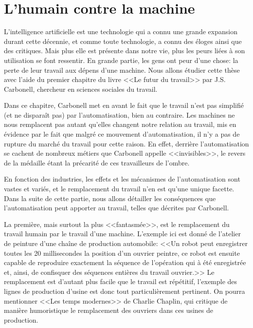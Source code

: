 \documentclass[openany, 11pt]{memoir}
\begin{document}

\chapter{L'humain contre la machine}


L'intelligence artificielle est une technologie qui a connu une grande expansion durant cette décennie, et comme toute technologie, a connu des éloges ainsi que des critiques. Mais plus elle est présente dans notre vie, plus les peurs liées à son utilisation se font ressentir. En grande partie, les gens ont peur d'une chose: la perte de leur travail aux dépens d'une machine. Nous allons étudier cette thèse avec l'aide du premier chapitre du livre <<Le futur du travail>> \cite{futurtravail} par J.S. Carbonell, chercheur en sciences sociales du travail.

Dans ce chapitre, Carbonell met en avant le fait que le travail n'est pas simplifié (et ne disparaît pas) par l'automatisation, bien au contraire. Les machines ne nous remplacent pas autant qu'elles changent notre relation au travail, mis en évidence par le fait que malgré ce mouvement d'automatisation, il n'y a pas de rupture du marché du travail pour cette raison. En effet, derrière l'automatisation se cachent de nombreux métiers que Carbonell appelle <<invisibles>>, le revers de la médaille étant la précarité de ces travailleurs de l'ombre.

En fonction des industries, les effets et les mécanismes de l'automatisation sont vastes et variés, et le remplacement du travail n'en est qu'une unique facette. Dans la suite de cette partie, nous allons détailler les conséquences que l'automatisation peut apporter au travail, telles que décrites par Carbonell.

\bigskip
La première, mais surtout la plus <<fantasmée>>, est le remplacement du travail humain par le travail d'une machine. L'exemple ici est donné de l'atelier de peinture d'une chaîne de production automobile: <<Un robot peut enregistrer toutes les 20 millisecondes la position d'un ouvrier peintre, ce robot est ensuite capable de reproduire exactement la séquence de l'opération qui à été enregistrée et, ainsi, de confisquer des séquences entières du travail ouvrier.>> Le remplacement est d'autant plus facile que le travail est répétitif, l'exemple des lignes de production d'usine est donc tout particulièrement pertinent. On pourra mentionner <<Les temps modernes>> de Charlie Chaplin, qui critique de manière humoristique le remplacement des ouvriers dans ces usines de production.
\end{document}
